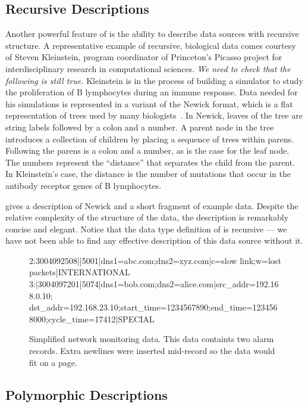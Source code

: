 \subsection{Recursive Descriptions}

Another powerful feature of \padsml{} is the ability to describe data
sources with recursive structure.  A representative example of
recursive, biological data comes courtesy of Steven Kleinstein,
program coordinator of Princeton's Picasso project for
interdisciplinary research in computational sciences.  
\emph{We need to check that the following is still true.} Kleinstein is
in the process of building a simulator to study the proliferation of B
lymphocytes during an immune response.  Data needed for his
simulations is represented in a variant of the Newick format, which is
a flat representation of trees used by many biologists~\cite{newick}.
In Newick, leaves of the tree are string labels followed by a colon
and a number.  A parent node in the tree introduces a collection of
children by placing a sequence of trees within parens.  Following the
parens is a colon and a number, as is the case for the leaf node.  The
numbers represent the ``distance'' that separates the child from the
parent.  In Kleinstein's case, the distance is the number of mutations
that occur in the antibody receptor genes of B lymphocytes.

 gives a description of Newick and a short fragment 
of example data.  Despite the relative complexity of the structure of the data,
the description is remarkably concise and elegant.  Notice that the data type
definition of  is recursive --- we have not been able to find any
effective description of this data source without it.

\begin{figure*}
  \centering
\begin{code}\scriptsize
 2:3004092508||5001|dns1=abc.com;dns2=xyz.com|c=slow link;w=lost packets|INTERNATIONAL
 3:|3004097201|5074|dns1=bob.com;dns2=alice.com|src_addr=192.168.0.10;
 dst_addr=192.168.23.10;start_time=1234567890;end_time=1234568000;cycle_time=17412|SPECIAL
\end{code}  
  \caption{Simplified network monitoring data.  This 
data containts two alarm records.  Extra newlines 
were inserted mid-record so the data would fit on a page.}
  \label{fig:darkstar-records}
\end{figure*}
  
\subsection{Polymorphic Descriptions}

